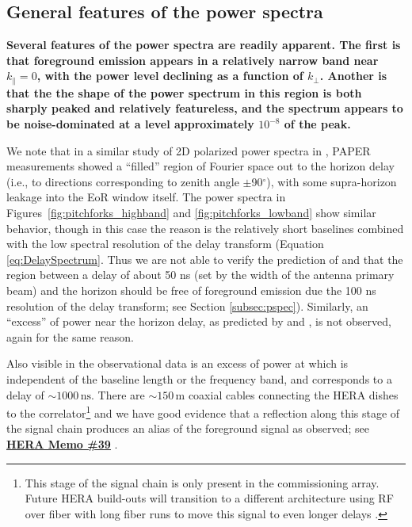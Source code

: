 \documentclass[twocolumn, trackchanges]{aastex61}
\newcommand{\edited}[1]{{\bf \color{red} #1}}
\begin{document}
\subsection{General features of the power spectra}
\label{subsec:general_features}

\edited{
Several features of the power spectra are readily apparent.  The first is that foreground emission appears in a relatively	 narrow band near $k_\parallel = 0$, with the power level declining as a function of $k_\perp$.  Another is that the the shape of the power spectrum in this region is both sharply peaked and relatively featureless, and the spectrum appears to be noise-dominated at a level approximately $10^{-8}$ of the peak.  

We note that in a similar study of 2D polarized power spectra in \citet{Kohn16}, PAPER measurements showed a ``filled'' region of Fourier space out to the horizon delay (i.e., to directions corresponding to zenith angle $\pm$90$^{\circ}$), with some supra-horizon leakage \citep[e.g.,][]{Pober13} into the EoR window itself. The power spectra in Figures~\ref{fig:pitchforks_highband} and \ref{fig:pitchforks_lowband} show similar behavior, though in this case the reason is the relatively short baselines combined with the low spectral resolution of the delay transform (Equation \ref{eq:DelaySpectrum}.   Thus we are not able to verify the prediction of \citet{Nithya.15b} and \citet{Neben.16} that the region between a delay of about 50 ns (set by the width of the antenna primary beam) and the horizon should be free of foreground emission due the 100 ns resolution of the delay transform;  see Section \ref{subsec:pspec}).  Similarly, an ``excess'' of power near the horizon delay, as predicted by \cite{Nithya.15b} and \cite{Neben.16}, is not observed, again for the same reason.  

Also visible in the observational data is an excess of power at which is independent of the baseline length or the frequency band, and corresponds to a delay of $\sim1000 \, \mathrm{ns}$.  There are $\sim 150 \, \mathrm{m}$ coaxial cables connecting the HERA dishes to the correlator\footnote{This stage of the signal chain is only present in the commissioning array. Future HERA build-outs will transition to a different architecture using RF over fiber with long fiber runs to move this signal to even longer delays \citep{deBoer17}.} and we have good evidence that a reflection along this stage of the signal chain produces an alias of the foreground signal as observed; see \href{http://reionization.org/wp-content/uploads/2013/03/HERA39_H1C_cable_reflections_ewall-wice.pdf}{\edited{\underline{HERA Memo \#39}}} \citep{hera_memo39}.


}
\end{document}
